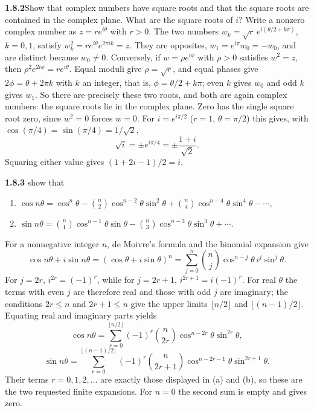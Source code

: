 \par\bigskip
\noindent\textbf{1.8.2}\quad Show that complex numbers have square roots and
that the square roots are contained in the complex plane. What are the square
roots of $i$?
\solution
Write a nonzero complex number as $z=re^{i\theta}$ with $r>0$.
The two numbers $w_k=\sqrt r\,e^{i(\theta/2+k\pi)}$, $k=0,1$,
satisfy $w_k^2=re^{i\theta}e^{2\pi ik}=z$. They are opposites,
$w_1=e^{i\pi}w_0=-w_0$, and are distinct because $w_0\ne0$.
Conversely, if $w=\rho e^{i\phi}$ with $\rho>0$ satisfies $w^2=z$,
then $\rho^2e^{2i\phi}=re^{i\theta}$. Equal moduli give $\rho=\sqrt r$,
and equal phases give $2\phi=\theta+2\pi k$ with $k$ an integer, that
is, $\phi=\theta/2+k\pi$; even $k$ gives $w_0$ and odd $k$ gives $w_1$.
So there are precisely these two roots, and both are again complex
numbers: the square roots lie in the complex plane.
Zero has the single square root zero, since $w^2=0$ forces $w=0$.
For $i=e^{i\pi/2}$ ($r=1$, $\theta=\pi/2$) this gives, with
$\cos(\pi/4)=\sin(\pi/4)=1/\sqrt2$,
\[
 \boxed{\sqrt i=\pm e^{i\pi/4}=\pm\frac{1+i}{\sqrt2}}.
\]
Squaring either value gives $(1+2i-1)/2=i$.


\par\bigskip
\noindent\textbf{1.8.3}\quad {} show that
\begin{enumerate}
\item[(a)] $\displaystyle\cos n\theta=\cos^{n}\theta-\binom{n}{2}
  \cos^{n-2}\theta\sin^{2}\theta+\binom{n}{4}\cos^{n-4}\theta\sin^{4}\theta
  -\cdots,$
\item[(b)] $\displaystyle\sin n\theta=\binom{n}{1}\cos^{n-1}\theta\sin\theta
  -\binom{n}{3}\cos^{n-3}\theta\sin^{3}\theta+\cdots.$
\end{enumerate}
\solution
{}
For a nonnegative integer $n$, de Moivre's formula and the binomial
expansion give
\[
 \cos n\theta+i\sin n\theta
 =(\cos\theta+i\sin\theta)^n
 =\sum_{j=0}^n\binom nj\cos^{n-j}\theta\,i^j\sin^j\theta.
\]
For $j=2r$, $i^{2r}=(-1)^r$, while for $j=2r+1$,
$i^{2r+1}=i(-1)^r$. For real $\theta$ the terms with even $j$ are
therefore real and those with odd $j$ are imaginary; the conditions
$2r\le n$ and $2r+1\le n$
give the upper limits $\lfloor n/2\rfloor$ and $\lfloor(n-1)/2\rfloor$.
Equating real and imaginary parts yields
\[
 \cos n\theta=\sum_{r=0}^{\lfloor n/2\rfloor}
 (-1)^r\binom n{2r}\cos^{n-2r}\theta\sin^{2r}\theta,
\]
\[
 \sin n\theta=\sum_{r=0}^{\lfloor(n-1)/2\rfloor}
 (-1)^r\binom n{2r+1}\cos^{n-2r-1}\theta\sin^{2r+1}\theta.
\]
Their terms $r=0,1,2,\ldots$ are exactly those displayed in (a) and
(b), so these are the two requested finite expansions. For $n=0$ the
second sum is empty and gives zero.

